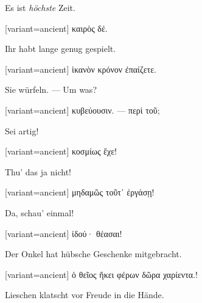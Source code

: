 Es ist \emph{höchste} Zeit. 

\switchcolumn

\begin{greek}[variant=ancient]%
καιρὸς δέ.

\end{greek}%
\switchcolumn*

Ihr habt lange genug gespielt.

\switchcolumn

\begin{greek}[variant=ancient]%
ἱκανὸν κρόνον ἐπαίζετε.

\end{greek}%
\switchcolumn*

Sie würfeln. — Um was?

\switchcolumn

\begin{greek}[variant=ancient]%
κυβεύουσιν. — περὶ τοῦ;

\end{greek}%
\switchcolumn*

Sei artig!

\switchcolumn

\begin{greek}[variant=ancient]%
κοσμίως ἔχε!

\end{greek}%
\switchcolumn*

Thu' das ja nicht!

\switchcolumn

\begin{greek}[variant=ancient]%
μηδαμῶς τοῦτ᾽ ἐργάσῃ!

\end{greek}%
\switchcolumn*

Da, schau' einmal!

\switchcolumn

\begin{greek}[variant=ancient]%
ἰδού· θέασαι!

\end{greek}%
\switchcolumn*

Der Onkel hat hübsche Geschenke mitgebracht.

\switchcolumn

\begin{greek}[variant=ancient]%
ὁ θεῖος ἥκει φέρων δῶρα χαρίεντα.!

\end{greek}%
\switchcolumn*

Lies\textcompwordmark{}chen klatscht vor Freude in die Hände.

